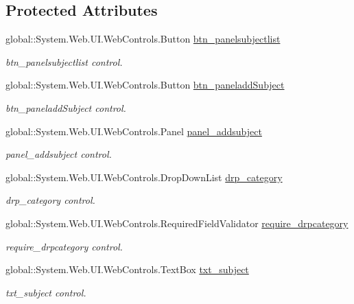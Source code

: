 \subsection*{Protected Attributes}
\begin{DoxyCompactItemize}
\item 
global\+::\+System.\+Web.\+U\+I.\+Web\+Controls.\+Button \mbox{\hyperlink{class_admin__subject_ad60e504f3d14c5f6f97aed964386d82a}{btn\+\_\+panelsubjectlist}}
\begin{DoxyCompactList}\small\item\em btn\+\_\+panelsubjectlist control. \end{DoxyCompactList}\item 
global\+::\+System.\+Web.\+U\+I.\+Web\+Controls.\+Button \mbox{\hyperlink{class_admin__subject_a55c98b2b2092c03b9a8a4941f8c69f8c}{btn\+\_\+paneladd\+Subject}}
\begin{DoxyCompactList}\small\item\em btn\+\_\+paneladd\+Subject control. \end{DoxyCompactList}\item 
global\+::\+System.\+Web.\+U\+I.\+Web\+Controls.\+Panel \mbox{\hyperlink{class_admin__subject_acadc2239916fc3693c767eb1f49ac326}{panel\+\_\+addsubject}}
\begin{DoxyCompactList}\small\item\em panel\+\_\+addsubject control. \end{DoxyCompactList}\item 
global\+::\+System.\+Web.\+U\+I.\+Web\+Controls.\+Drop\+Down\+List \mbox{\hyperlink{class_admin__subject_a75a8debb20d63be717759cd5bcbf2711}{drp\+\_\+category}}
\begin{DoxyCompactList}\small\item\em drp\+\_\+category control. \end{DoxyCompactList}\item 
global\+::\+System.\+Web.\+U\+I.\+Web\+Controls.\+Required\+Field\+Validator \mbox{\hyperlink{class_admin__subject_aaed9d8a4f7fb46df05ce3394ec7af2a1}{require\+\_\+drpcategory}}
\begin{DoxyCompactList}\small\item\em require\+\_\+drpcategory control. \end{DoxyCompactList}\item 
global\+::\+System.\+Web.\+U\+I.\+Web\+Controls.\+Text\+Box \mbox{\hyperlink{class_admin__subject_a10fe3f208bc27fdc254caa37c13f5f2a}{txt\+\_\+subject}}
\begin{DoxyCompactList}\small\item\em txt\+\_\+subject control. \end{DoxyCompactList}\item 

\end{DoxyCompactItemize}
